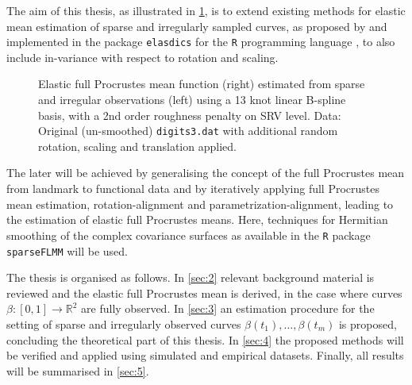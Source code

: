 The aim of this thesis, as illustrated in \cref{fig:1-mean}, is to extend existing methods for elastic mean estimation of sparse and irregularly sampled curves, as proposed by \cite{Steyer2021} and implemented in the package \texttt{elasdics} \parencite{elasdics} for the \texttt{R} programming language \parencite{R}, to also include in-variance with respect to rotation and scaling.
\begin{figure}
  \centering
  \begin{subfigure}{.48\textwidth}
    \centering
  \end{subfigure}\hfill%
  \begin{subfigure}{.48\textwidth}
    \centering
  \end{subfigure}
  \caption{Elastic full Procrustes mean function (right) estimated from sparse and irregular observations (left) using a 13 knot linear B-spline basis, with a 2nd order roughness penalty on SRV level. Data: Original (un-smoothed) \texttt{digits3.dat} with additional random rotation, scaling and translation applied.}
  \label{fig:1-mean}
\end{figure}
The later will be achieved by generalising the concept of the full Procrustes mean from landmark to functional data and by iteratively applying full Procrustes mean estimation, rotation-alignment and parametrization-alignment, leading to the estimation of elastic full Procrustes means.
Here, techniques for Hermitian smoothing of the complex covariance surfaces as available in the \texttt{R} package \texttt{sparseFLMM} \parencite{sparseFLMM} will be used.


The thesis is organised as follows.
In \cref{sec:2} relevant background material is reviewed and the elastic full Procrustes mean is derived, in the case where curves $\beta:[0,1] \rightarrow \mathbb{R}^2$ are fully observed. 
In \cref{sec:3} an estimation procedure for the setting of sparse and irregularly observed curves $\beta(t_1), \dots, \beta(t_m)$ is proposed, concluding the theoretical part of this thesis.
In \cref{sec:4} the proposed methods will be verified and applied using simulated and empirical datasets.
Finally, all results will be summarised in \cref{sec:5}.
